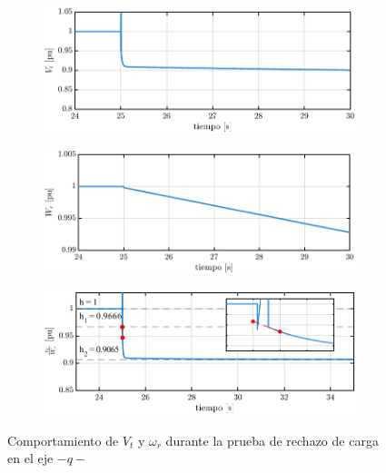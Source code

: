 \documentclass[conference]{IEEEtran}
\begin{document}
\begin{figure}[H]
    \centering
    \begin{subfigure}
        \centering
        \includegraphics[width=\linewidth]{Fig/fig3.pdf}
        \label{fig:fig3}
    \end{subfigure}
    \hfill
    \begin{subfigure}
        \centering
        \includegraphics[width=\linewidth]{Fig/fig4.pdf}
        \label{fig:fig4}
    \end{subfigure}
    \hfill
    \begin{subfigure}
        \centering
        \includegraphics[width=\linewidth]{Fig/fig5.pdf}
        
        \label{fig:fig5}
    \end{subfigure}
    \caption{Comportamiento de $V_t$ y $\omega_r$ durante la prueba de rechazo de carga en el eje $-q-$}
    \label{fig:subfigs}
\end{figure}
\end{document}
